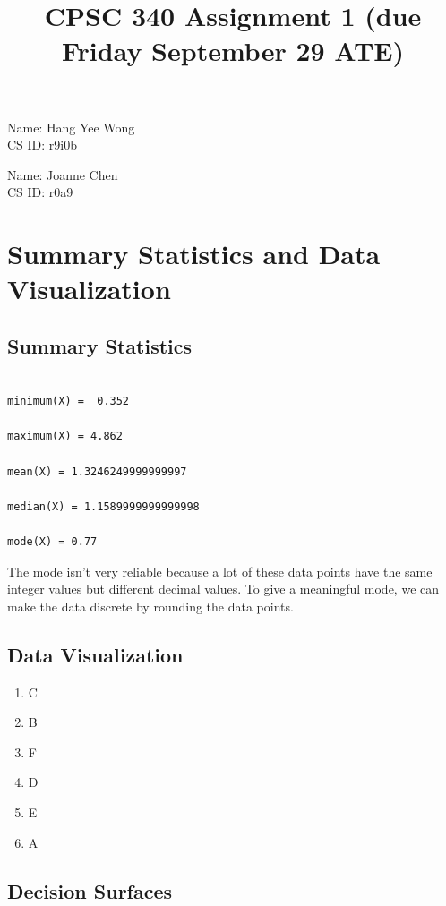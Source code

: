\documentclass{article}
\begin{document}
\title{CPSC 340 Assignment 1 (due Friday September 29 ATE)}
\author{}
\date{}
\maketitle
\vspace{-4em}


Name: Hang Yee Wong\\
CS ID: r9i0b 

Name: Joanne Chen\\
CS ID: r0a9


\section{Summary Statistics and Data Visualization}

\subsection{Summary Statistics}

\begin{verbatim}

minimum(X) =  0.352

maximum(X) = 4.862

mean(X) = 1.3246249999999997

median(X) = 1.1589999999999998

mode(X) = 0.77

\end{verbatim}

The mode isn't very reliable because a lot of these data points have the same integer values but different decimal values. To give a meaningful mode, we can make the data discrete by rounding the data points.



\subsection{Data Visualization}

\begin{enumerate}
\item C
\item B
\item F
\item D
\item E
\item A
\end{enumerate}


\subsection{Decision Surfaces}
\end{document}
